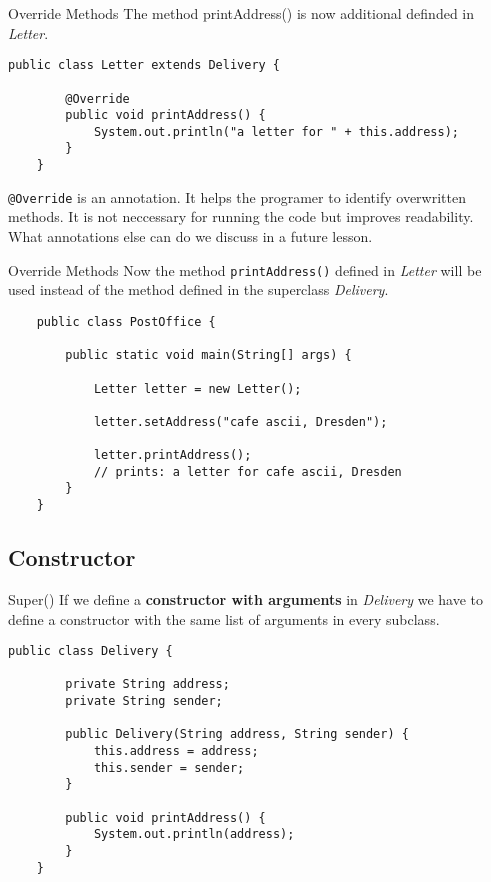 \begin{frame}[fragile]{Override Methods}
	The method printAddress() is now additional definded in \emph{Letter}.
	\begin{lstlisting}[escapechar=!]
	public class Letter extends Delivery {
	
	    @Override
	    public void printAddress() {
	        System.out.println("a letter for " + this.address);    
	    }	
	}
	\end{lstlisting}
	\texttt{@Override} is an annotation. 
	It helps the programer to identify overwritten methods.
	It is not neccessary for running the code but improves readability.
	What annotations else can do we discuss in a future lesson.
\end{frame}
\begin{frame}[fragile]{Override Methods}
	Now the method \texttt{printAddress()} defined in \emph{Letter} will be used instead of the method defined
	in the superclass \emph{Delivery}.
	\begin{lstlisting}
	public class PostOffice {
	
	    public static void main(String[] args) {
	    
	        Letter letter = new Letter();
	        
	        letter.setAddress("cafe ascii, Dresden");
	        
	        letter.printAddress();
	        // prints: a letter for cafe ascii, Dresden
	    }	
	}
	\end{lstlisting}
\end{frame}

\subsection{Constructor}
\begin{frame}[fragile]{Super()}
	If we define a \textbf{constructor with arguments} in \emph{Delivery} we have to define a constructor
	with the same list of arguments in every subclass.
	\begin{lstlisting}[basicstyle=\ttfamily\scriptsize]
	public class Delivery {
	
	    private String address;
	    private String sender;
	    
	    public Delivery(String address, String sender) {
	        this.address = address;
	        this.sender = sender;
	    }
	    	    
	    public void printAddress() {
	        System.out.println(address);
	    }
	}
	\end{lstlisting}
\end{frame}

